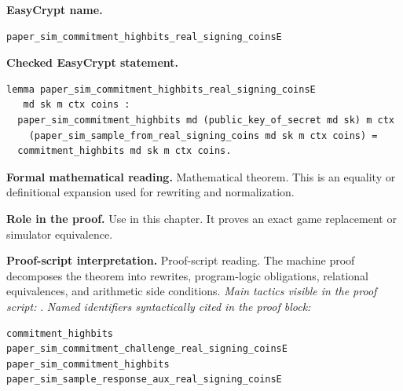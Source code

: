 \begin{formaltheorem}
\noindent\textbf{EasyCrypt name.}
\begin{lstlisting}[language=EasyCrypt,basicstyle=\ttfamily\scriptsize]
paper_sim_commitment_highbits_real_signing_coinsE
\end{lstlisting}
\noindent\textbf{Checked EasyCrypt statement.}
\begin{lstlisting}[language=EasyCrypt,basicstyle=\ttfamily\scriptsize]
lemma paper_sim_commitment_highbits_real_signing_coinsE
   md sk m ctx coins :
  paper_sim_commitment_highbits md (public_key_of_secret md sk) m ctx
    (paper_sim_sample_from_real_signing_coins md sk m ctx coins) =
  commitment_highbits md sk m ctx coins.
\end{lstlisting}
\noindent\textbf{Formal mathematical reading.}
Mathematical theorem. This is an equality or definitional expansion used for rewriting and normalization.

\noindent\textbf{Role in the proof.}
Use in this chapter. It proves an exact game replacement or simulator equivalence.

\noindent\textbf{Proof-script interpretation.}
Proof-script reading. The machine proof decomposes the theorem into rewrites, program-logic obligations, relational equivalences, and arithmetic side conditions.
\emph{Main tactics visible in the proof script:} .
\emph{Named identifiers syntactically cited in the proof block:}
\begin{lstlisting}[language=EasyCrypt,basicstyle=\ttfamily\scriptsize]
commitment_highbits
paper_sim_commitment_challenge_real_signing_coinsE
paper_sim_commitment_highbits
paper_sim_sample_response_aux_real_signing_coinsE
\end{lstlisting}

\end{formaltheorem}

